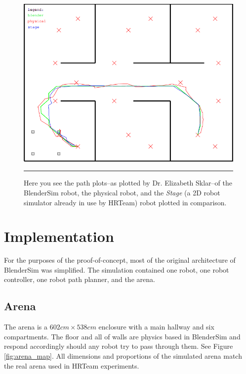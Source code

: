 \begin{figure}[htbp]
\centering
\includegraphics[scale=0.55]{../Figures/Chapter5/const_motion_model_plotted.png}
\rule{35em}{0.5pt}
\caption[Comparative Path Plots]{Here you see the path plots--as plotted by Dr. Elizabeth Sklar--of the BlenderSim robot, the physical robot, and the \textit{Stage} (a 2D robot simulator already in use by HRTeam)\cite{website:stage} robot plotted in comparison.}
\label{sklarplots}
\end{figure}

\section{Implementation}

For the purposes of the proof-of-concept, most of the original architecture of BlenderSim was simplified. The simulation contained one robot, one robot controller, one robot path planner, and the arena. 

\subsection{Arena}

The arena is a $602cm\times538cm$ enclosure with a main hallway and six compartments. The floor and all of walls are physics based in BlenderSim and respond accordingly should any robot try to pass through them. See Figure \ref{fig:arena_map}. All dimensions and proportions of the simulated arena match the real arena used in HRTeam experiments. 

